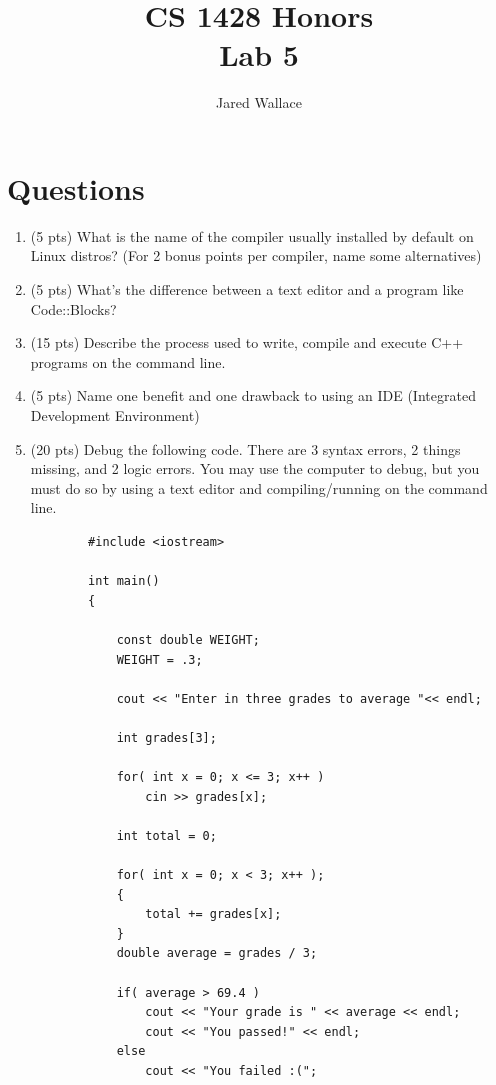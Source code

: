 \documentclass[letterpaper,12pt]{article}
\title{\Large CS 1428 Honors\\Lab 5}
\author{Jared Wallace}
\date{}
\begin{document}
\maketitle

\vspace{30mm}

\section*{Questions}

\begin{enumerate}
    \item (5 pts) What is the name of the compiler usually installed by default on Linux distros? (For 2 bonus
                  points per compiler, name some alternatives)
    \item (5 pts) What's the difference between a text editor and a program like Code::Blocks?
    \item (15 pts) Describe the process used to write, compile and execute C++ programs on the command line.
    \item (5 pts) Name one benefit and one drawback to using an IDE (Integrated Development Environment)
    \item (20 pts) Debug the following code. There are 3 syntax errors, 2 things missing, and 2 logic errors.
                   You may use the computer to debug, but you must do so by using a text editor and compiling/running
                   on the command line.
    \begin{lstlisting}
        #include <iostream>

        int main()
        {

            const double WEIGHT;
            WEIGHT = .3;

            cout << "Enter in three grades to average "<< endl;

            int grades[3];

            for( int x = 0; x <= 3; x++ )
                cin >> grades[x];

            int total = 0;

            for( int x = 0; x < 3; x++ );
            {
                total += grades[x];
            }
            double average = grades / 3;

            if( average > 69.4 )
                cout << "Your grade is " << average << endl;
                cout << "You passed!" << endl;
            else
                cout << "You failed :(";


\end{lstlisting}
\end{enumerate}
\end{document}
